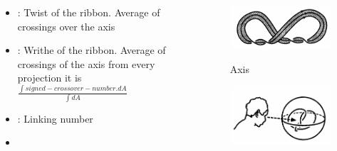 \begin{frame}
\begin{columns}[T]
\begin{column}{.48\textwidth}
\begin{itemize}
    \item {}: Twist of the ribbon. Average of crossings over the axis
    \item {}: Writhe of the ribbon. Average of crossings of the axis from every projection it is \\ \vspace{0.2cm} $\frac{\int signed-crossover-number.dA }{\int dA}$
    \item {}: Linking number
    \item {}
\end{itemize}
\end{column}
\begin{column}{.48\textwidth}
\begin{figure}
    \centering
    \includegraphics[width=0.6\linewidth]{images/ribbon.png}
    \caption{Axis}
    \label{axis}
    \cite{adams2004knot}
\end{figure}
\begin{figure}
    \centering
    \includegraphics[width=0.6\linewidth]{images/vantage.png}
    \label{vantage}
    \cite{adams2004knot}
\end{figure}
\end{column}
\end{columns}
    
\end{frame}
